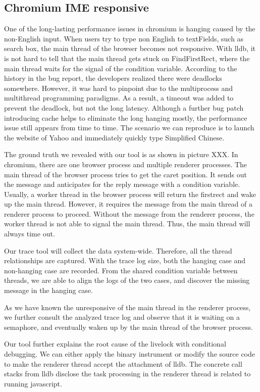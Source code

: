 \subsection{Chromium IME responsive}
One of the long-lasting performance issues in chromium is hanging caused by the non-English input.
When users try to type non English to textFields, such as search box,
the main thread of the browser becomes not responsive.
With lldb, it is not hard to tell that the main thread gets stuck on FindFirstRect,
where the main thread waits for the signal of the condition variable.
According to the history in the bug report, the developers realized there were deadlocks somewhere.
However, it was hard to pinpoint due to the multiprocess and multithread programming paradigms.
As a result, a timeout was added to prevent the deadlock, but not the long latency.
Although a further bug patch introducing cache helps to eliminate the long hanging mostly, 
the performance issue still appears from time to time.
The scenario we can reproduce is to launch the website of Yahoo and immediately quickly type Simplified Chinese.

The ground truth we revealed with our tool is as shown in picture XXX.
In chromium, there are one browser process and multiple renderer processes.
The main thread of the browser process tries to get the caret position.
It sends out the message and anticipates for the reply message with a condition variable.
Usually, a worker thread in the browser process will return the firstrect and wake up the main thread.
However, it requires the message from the main thread of a renderer process to proceed.
Without the message from the renderer process, the worker thread is not able to signal the main thread.
Thus, the main thread will always time out.

Our trace tool will collect the data system-wide.
Therefore, all the thread relationships are captured.
With the trace log size, both the hanging case and non-hanging case are recorded.
From the shared condition variable between threads, we are able to align the logs of the two cases,
and discover the missing message in the hanging case.

As we have known the unresponsive of the main thread in the renderer process,
we further consult the analyzed trace log and observe that it is waiting on a semaphore,
and eventually waken up by the main thread of the browser process.

Our tool further explains the root cause of the livelock with conditional debugging.
We can either apply the binary instrument or modify the source code to make the renderer thread accept the attachment of lldb.
The concrete call stacks from lldb disclose the task processing in the renderer thread is related to running javascript.
